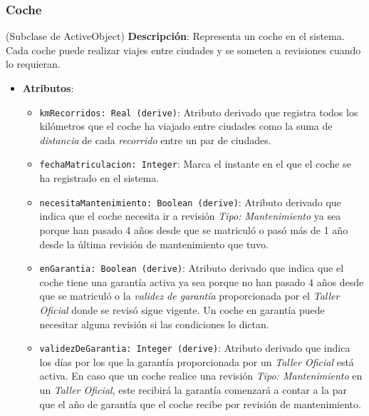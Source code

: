\documentclass[12pt.a4paper]{article}
\begin{document}
\subsubsection{Coche} (Subclase de ActiveObject)
\textbf{Descripción}:  
Representa un coche en el sistema. Cada coche puede realizar viajes entre ciudades y se someten a revisiones cuando lo requieran.
\begin{itemize}
    \item \textbf{Atributos}:
    \begin{itemize}
        \item \texttt{kmRecorridos: Real (derive)}: Atributo derivado que registra todos los kilómetros que el coche ha viajado entre ciudades como la suma de
        \textit{distancia} de cada \textit{recorrido} entre un par de ciudades.
        \item \texttt{fechaMatriculacion: Integer}: Marca el instante en el que el coche se ha registrado en el sistema.
        \item \texttt{necesitaMantenimiento: Boolean (derive)}: Atributo derivado que indica que el coche necesita ir a revisión \textit{Tipo: Mantenimiento} ya sea porque han pasado 4 años desde que se matriculó o pasó más de 1 año desde la última revisión de mantenimiento que tuvo.
        \item \texttt{enGarantia: Boolean (derive)}: Atributo derivado que indica que el coche tiene una garantía activa ya sea porque no han pasado 4 años desde que se matriculó o la \textit{validez de garantía} proporcionada por el \textit{Taller Oficial} donde se revisó sigue vigente. Un coche en garantía puede necesitar alguna revisión si las condiciones lo dictan.
        \item \texttt{validezDeGarantia: Integer (derive)}: Atributo derivado que indica los días por los que la garantía proporcionada por un \textit{Taller Oficial} está activa. En caso que un coche realice una revisión \textit{Tipo: Mantenimiento} en un \textit{Taller Oficial}, este recibirá la garantía comenzará a contar a la par que el año de garantía que el coche recibe por revisión de mantenimiento.
    \end{itemize}
\end{itemize}
\end{document}
